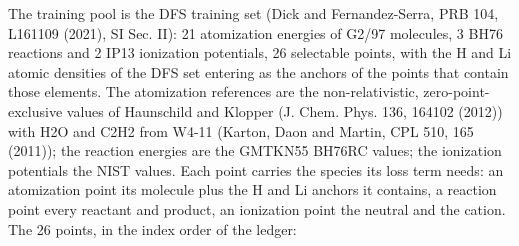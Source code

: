 \documentclass[10pt,a4paper]{article}
\begin{document}
The training pool is the DFS training set (Dick and Fernandez-Serra, PRB 104, L161109 (2021), SI Sec. II): 21 atomization energies of G2/97 molecules, 3 BH76 reactions and 2 IP13 ionization potentials, 26 selectable points, with the H and Li atomic densities of the DFS set entering as the anchors of the points that contain those elements. The atomization references are the non-relativistic, zero-point-exclusive values of Haunschild and Klopper (J. Chem. Phys. 136, 164102 (2012)) with H2O and C2H2 from W4-11 (Karton, Daon and Martin, CPL 510, 165 (2011)); the reaction energies are the GMTKN55 BH76RC values; the ionization potentials the NIST values. Each point carries the species its loss term needs: an atomization point its molecule plus the H and Li anchors it contains, a reaction point every reactant and product, an ionization point the neutral and the cation. The 26 points, in the index order of the ledger:
\end{document}
